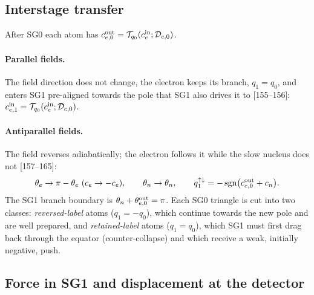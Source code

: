 \documentclass[11pt,a4paper]{article}
\newcommand{\D}{\mathcal{D}}
\newcommand{\T}{\mathcal{T}}
\newcommand{\pa}{{\uparrow\downarrow}}
\newcommand{\cin}{c_e^{\rm in}}
\begin{document}
\subsection{Interstage transfer}

After SG0 each atom has $c_{e,0}^{\rm out}=\T_{q_0}(\cin;\D_{c,0})$.

\paragraph{Parallel fields.} The field direction does not change, the electron keeps its branch,
$q_1=q_0$, and enters SG1 pre-aligned towards the pole that SG1 also drives it to [155--156]:
$c_{e,1}^{\rm in}=\T_{q_0}(\cin;\D_{c,0})$.

\paragraph{Antiparallel fields.} The field reverses adiabatically; the electron follows it while the
slow nucleus does not [157--165]:
\begin{equation}
\theta_e\to\pi-\theta_e\ (c_e\to-c_e),\qquad \theta_n\to\theta_n,\qquad
q_1^\pa=-\operatorname{sgn}\!\big(c_{e,0}^{\rm out}+c_n\big).
\end{equation}
The SG1 branch boundary is $\theta_n+\theta_{e,0}^{\rm out}=\pi$. Each SG0 triangle is cut into two
classes: \emph{reversed-label} atoms ($q_1=-q_0$), which continue towards the new pole and are well
prepared, and \emph{retained-label} atoms ($q_1=q_0$), which SG1 must first drag back through the
equator (counter-collapse) and which receive a weak, initially negative, push.

\subsection{Force in SG1 and displacement at the detector}
\end{document}
